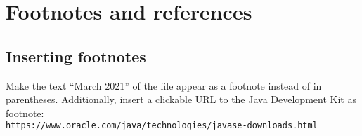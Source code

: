 \section{Footnotes and references}

\subsection{Inserting footnotes}

Make the text \enquote{March 2021} of the file 
 appear as a footnote instead of in 
parentheses. Additionally, insert a clickable URL to the Java Development Kit 
as footnote: \\ \texttt{https://www.oracle.com/java/technologies/javase-downloads.html}
